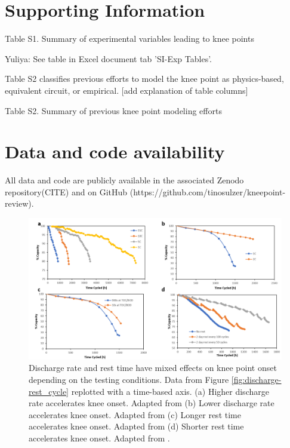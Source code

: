 \documentclass[journal=jpcl, manuscript=article, layout=onecolumn]{achemso}
\begin{document}
\section{Supporting Information}

Table S1. Summary of experimental variables leading to knee points


Yuliya: See table in Excel document tab 'SI-Exp Tables'. 

Table S2 classifies previous efforts to model the knee point as physics-based, equivalent circuit, or empirical. [add explanation of table columns]

Table S2. Summary of previous knee point modeling efforts

\section{Data and code availability}

All data and code are publicly available in the associated Zenodo repository(CITE) and on GitHub (https://github.com/tinosulzer/kneepoint-review).


\begin{figure}[ht]
\centering
\includegraphics[scale = 0.6]{figures/Discharge-rest_time.png}
\caption{Discharge rate and rest time have mixed effects on knee point onset depending on the testing conditions. Data from Figure \ref{fig:discharge-rest_cycle} replotted with a time-based axis. (a) Higher discharge rate accelerates knee onset. Adapted from \cite{omar_lithium_2014} (b) Lower discharge rate accelerates knee onset. Adapted from \cite{keil_linear_2019} (c) Longer rest time accelerates knee onset. Adapted from \cite{keil_linear_2019} (d) Shorter rest time accelerates knee onset. Adapted from \cite{epding_investigation_2019}.}
\label{fig:discharge-rest_time}
\end{figure}

% 

\end{document}
